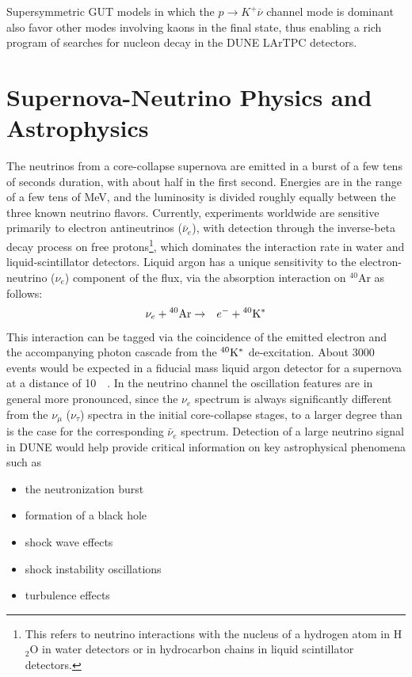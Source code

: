 Supersymmetric GUT models in which
the $p\to K^+\overline{\nu}$ channel mode is dominant also favor
other modes involving kaons in the final state, thus enabling a rich 
program of searches for nucleon decay in the DUNE LArTPC detectors.


\section{Supernova-Neutrino Physics and Astrophysics}

The neutrinos from a core-collapse supernova are emitted in a burst of
a few tens of seconds duration, with about half in the first
second. Energies are in the range of a few tens of MeV, and the
luminosity is divided roughly equally between the three known neutrino
flavors.  Currently, experiments worldwide are sensitive primarily to
electron antineutrinos ($\bar{\nu}_e$), with detection through the inverse-beta decay
process on free protons\footnote{This refers to neutrino interactions with the nucleus of a
hydrogen atom in H$_2$O in water detectors or in hydrocarbon chains in 
liquid scintillator detectors.},
 which dominates the interaction rate in water
and liquid-scintillator detectors.  Liquid argon has a unique sensitivity to
the electron-neutrino ($\nu_e$) component of the flux, via the absorption
interaction on $^{40}$Ar as follows:
\begin{eqnarray*}
\nu_e +{}^{40}{\rm Ar} & \rightarrow & e^-+{}^{40}{\rm K^*}
\end{eqnarray*} 
This interaction can be tagged via the coincidence of the emitted
electron and the accompanying photon cascade from the $^{40}{\rm K^*}$
de-excitation.  About \num{3000} events would be expected in a 
fiducial mass liquid argon detector for a supernova at a distance of
\SI{10}{\kilo\parsec}.  In the neutrino channel the oscillation
features are in general more pronounced, since the $\nu_e$ spectrum is
always significantly different from the $\nu_\mu$ ($\nu_\tau$) spectra
in the initial core-collapse stages, to a larger degree than is the
case for the corresponding $\bar{\nu}_e$ spectrum.  Detection of a large
neutrino signal in DUNE would help provide critical information on key
astrophysical phenomena such as
\begin{itemize}
\item the neutronization burst
\item formation of a black hole
\item shock wave effects
\item shock instability oscillations
\item turbulence effects
\end{itemize}

